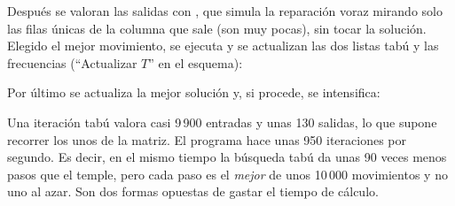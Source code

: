 Después se valoran las salidas con , que simula la reparación voraz
mirando solo las filas únicas de la columna que sale (son muy pocas), sin tocar la solución.
Elegido el mejor movimiento, se ejecuta y se actualizan las dos listas tabú y las
frecuencias (``Actualizar $T$'' en el esquema):


Por último se actualiza la mejor solución y, si procede, se intensifica:


\begin{idea}
Una iteración tabú valora casi 9\,900 entradas y unas 130 salidas, lo que supone recorrer
los unos de la matriz. El programa hace unas 950 iteraciones por segundo. Es decir, en el
mismo tiempo la búsqueda tabú da unas 90 veces menos pasos que el temple, pero cada paso es
el \emph{mejor} de unos 10\,000 movimientos y no uno al azar. Son dos formas opuestas de
gastar el tiempo de cálculo.
\end{idea}
